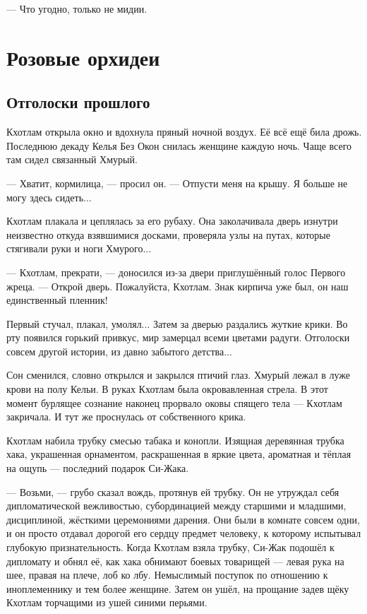 --- Что угодно, только не мидии.

\chapter{Розовые орхидеи}

\section{Отголоски прошлого}

Кхотлам открыла окно и вдохнула пряный ночной воздух.
Её всё ещё била дрожь.
Последнюю декаду Келья Без Окон снилась женщине каждую ночь.
Чаще всего там сидел связанный Хмурый.

--- Хватит, кормилица, --- просил он.
--- Отпусти меня на крышу.
Я больше не могу здесь сидеть...

Кхотлам плакала и цеплялась за его рубаху.
Она заколачивала дверь изнутри неизвестно откуда взявшимися досками, проверяла узлы на путах, которые стягивали руки и ноги Хмурого...

--- Кхотлам, прекрати, --- доносился из-за двери приглушённый голос Первого жреца.
--- Открой дверь.
Пожалуйста, Кхотлам.
Знак кирпича уже был, он наш единственный пленник!

Первый стучал, плакал, умолял...
Затем за дверью раздались жуткие крики.
Во рту появился горький привкус, мир замерцал всеми цветами радуги.
Отголоски совсем другой истории, из давно забытого детства...

Сон сменился, словно открылся и закрылся птичий глаз.
Хмурый лежал в луже крови на полу Кельи.
В руках Кхотлам была окровавленная стрела.
В этот момент бурлящее сознание наконец прорвало оковы спящего тела --- Кхотлам закричала.
И тут же проснулась от собственного крика.

Кхотлам набила трубку смесью табака и конопли.
Изящная деревянная трубка хака, украшенная орнаментом, раскрашенная в яркие цвета, ароматная и тёплая на ощупь --- последний подарок Си-Жака.

--- Возьми, --- грубо сказал вождь, протянув ей трубку.
Он не утруждал себя дипломатической вежливостью, субординацией между старшими и младшими, дисциплиной, жёсткими церемониями дарения.
Они были в комнате совсем одни, и он просто отдавал дорогой его сердцу предмет человеку, к которому испытывал глубокую признательность.
Когда Кхотлам взяла трубку, Си-Жак подошёл к дипломату и обнял её, как хака обнимают боевых товарищей --- левая рука на шее, правая на плече, лоб ко лбу.
Немыслимый поступок по отношению к иноплеменнику и тем более женщине.
Затем он ушёл, на прощание задев щёку Кхотлам торчащими из ушей синими перьями.

